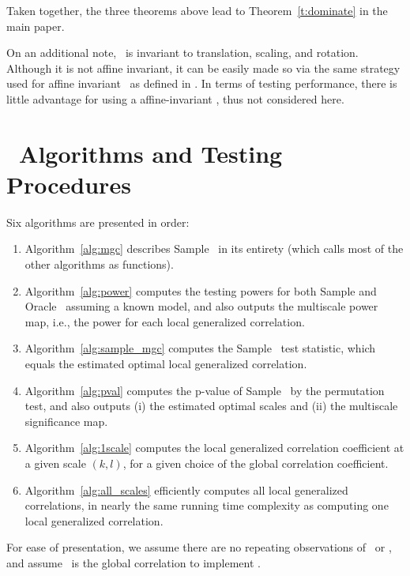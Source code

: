 \documentclass[11pt]{article}
\begin{document}
Taken together, the three theorems above lead to Theorem~\ref{t:dominate} in the main paper.

On an additional note, \Mgc~is invariant to translation, scaling, and rotation. Although it is not affine invariant, it can be easily made so via the same strategy used for affine invariant \Dcorr~as defined in \cite{SzekelyRizzoBakirov2007, Dueck2014}. In terms of testing performance, there is little advantage for using a affine-invariant \Mgc, thus not considered here.


\clearpage

\section{\Mgc~Algorithms and Testing Procedures}
\label{appen:algorithms}


Six algorithms are presented in order:
\begin{enumerate}
\item Algorithm~\ref{alg:mgc} describes Sample \Mgc~in its entirety (which calls most of the other algorithms as functions). 
\item Algorithm~\ref{alg:power} computes the testing powers for both Sample and Oracle \Mgc~assuming a known model, and also outputs  the multiscale power map, i.e., the power for each local generalized correlation.
\item Algorithm~\ref{alg:sample_mgc} computes the Sample \Mgc~test statistic, which equals the estimated optimal local generalized correlation.
\item Algorithm~\ref{alg:pval} computes the p-value of Sample \Mgc~by the permutation test, and also outputs (i) the estimated optimal scales and (ii) the multiscale significance map. 
\item Algorithm~\ref{alg:1scale} computes the local generalized correlation coefficient at a given scale $(k,l)$, for a given choice of the global correlation coefficient.
\item Algorithm~\ref{alg:all_scales} efficiently computes all local generalized correlations, in nearly the same running time complexity as computing one local generalized correlation. 
\end{enumerate}
For ease of presentation, we assume there are no repeating observations of \mbx~or \mby, and assume \Mcorr~is the global correlation to implement \Mgc.
\end{document}
